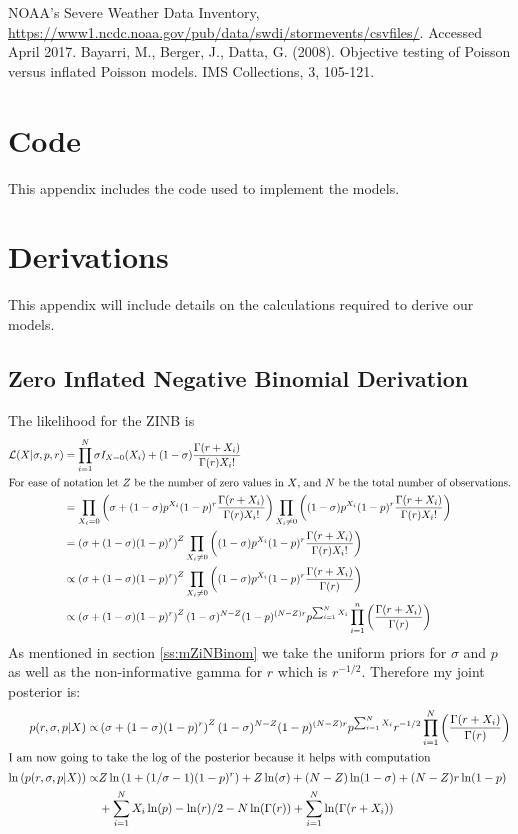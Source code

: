 \documentclass{article}
\begin{document}
\begin{thebibliography}{1}
   NOAA's Severe Weather Data Inventory, 
    \url{https://www1.ncdc.noaa.gov/pub/data/swdi/stormevents/csvfiles/}. 
    Accessed April 2017.
    Bayarri, M., Berger, J., Datta, G. (2008). Objective testing of Poisson versus inflated Poisson models. IMS 	Collections, 3, 105-121. 
\end{thebibliography}
\clearpage
\appendix
\section{Code}
\label{a:code}
This appendix includes the code used to implement the models.

\section{Derivations}
\label{a:derivation}
This appendix will include details on the calculations required to derive our models.
\subsection{Zero Inflated Negative Binomial Derivation}
\label{a:dZINB}
The likelihood for the ZINB is 
\begin{align*}
\mathcal{L}(X|\sigma, p, r) &= \prod_{i=1}^N \sigma I_{X=0}(X_i) + (1-\sigma)\frac{\Gamma(r+X_i)}{\Gamma(r)X_i!}\\
\intertext{For ease of notation let $Z$ be the number of zero values in $X$, and $N$ be the total number of observations.}
&=\prod_{X_i=0}\left(\sigma + (1-\sigma)p^{X_i}(1-p)^r\frac{\Gamma(r+X_i)}{\Gamma(r)X_i!}\right)\prod_{X_i\ne 0}\left((1-\sigma)p^{X_i}(1-p)^r\frac{\Gamma(r+X_i)}{\Gamma(r)X_i!}\right)\\
&=\left(\sigma + (1-\sigma)(1-p)^r\right)^Z\prod_{X_i\ne 0}\left((1-\sigma)p^{X_i}(1-p)^r\frac{\Gamma(r+X_i)}{\Gamma(r)X_i!}\right)\\
&\propto\left(\sigma + (1-\sigma)(1-p)^r\right)^Z\prod_{X_i\ne 0}\left((1-\sigma)p^{X_i}(1-p)^r\frac{\Gamma(r+X_i)}{\Gamma(r)}\right)\\
&\propto\left(\sigma + (1-\sigma)(1-p)^r\right)^Z(1-\sigma)^{N-Z}(1-p)^{(N-Z)r}p^{\sum_{i=1}^NX_i}\prod_{i=1}^n\left(\frac{\Gamma(r+X_i)}{\Gamma(r)}\right)
\end{align*}
As mentioned in section \ref{ss:mZiNBinom} we take the uniform priors for $\sigma$ and $p$ as well as the non-informative gamma for $r$ which is $r^{-1/2}$. Therefore my joint posterior is:
\begin{align*}
p(r,\sigma, p|X)\propto&\left(\sigma + (1-\sigma)(1-p)^r\right)^Z(1-\sigma)^{N-Z}(1-p)^{(N-Z)r}p^{\sum_{i=1}^NX_i}r^{-1/2}\prod_{i=1}^N\left(\frac{\Gamma(r+X_i)}{\Gamma(r)}\right)\\
\intertext{I am now going to take the log of the posterior because it helps with computation}
\ln\left(p(r,\sigma, p|X)\right)\propto&Z\ln\left(1 + (1/\sigma-1)(1-p)^r\right) + Z\ln(\sigma) + (N-Z)\ln(1-\sigma)+(N-Z)r\ln(1-p)\\
&+\sum_{i=1}^NX_i\ln(p)-\ln(r)/2-N\ln(\Gamma(r))+\sum_{i=1}^N\ln(\Gamma(r+X_i))
\end{align*}
\end{document}
